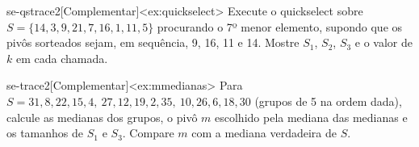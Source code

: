 \begin{exercicio}{se-qstrace2}[Complementar]<ex:quickselect>
Execute o quickselect sobre $S=\{14,3,9,21,7,16,1,11,5\}$ procurando o 7º menor elemento, supondo que os pivôs sorteados sejam, em sequência, 9, 16, 11 e 14. Mostre $S_1$, $S_2$, $S_3$ e o valor de $k$ em cada chamada.
\end{exercicio}
\begin{exercicio}{se-trace2}[Complementar]<ex:mmedianas>
Para $S=31,8,22,15,4,\ 27,12,19,2,35,\ 10,26,6,18,30$ (grupos de 5 na ordem dada), calcule as medianas dos grupos, o pivô $m$ escolhido pela mediana das medianas e os tamanhos de $S_1$ e $S_3$. Compare $m$ com a mediana verdadeira de $S$.
\end{exercicio}
